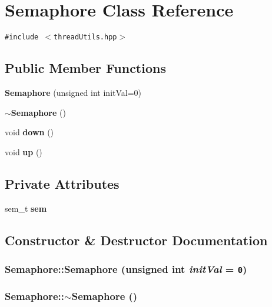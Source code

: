 \section{Semaphore Class Reference}
\label{classSemaphore}
{\tt \#include $<$thread\-Utils.hpp$>$}

\subsection*{Public Member Functions}
\begin{CompactItemize}
\item 
{\bf Semaphore} (unsigned int init\-Val=0)
\item 
{\bf $\sim$Semaphore} ()
\item 
void {\bf down} ()
\item 
void {\bf up} ()
\end{CompactItemize}
\subsection*{Private Attributes}
\begin{CompactItemize}
\item 
sem\_\-t {\bf sem}
\end{CompactItemize}


\subsection{Constructor \& Destructor Documentation}
\subsubsection{\setlength{\rightskip}{0pt plus 5cm}Semaphore::Semaphore (unsigned int {\em init\-Val} = {\tt 0})\hspace{0.3cm}{\tt  [inline]}}\label{classSemaphore_570698c680a467b9b0a708635149d54a}


\subsubsection{\setlength{\rightskip}{0pt plus 5cm}Semaphore::$\sim$Semaphore ()\hspace{0.3cm}{\tt  [inline]}}\label{classSemaphore_633658a6fde276bffc912028725c6ade}




